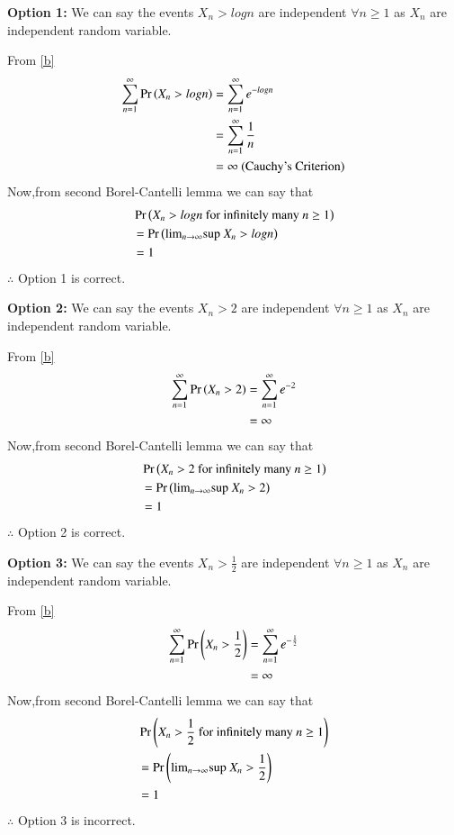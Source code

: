 \documentclass[journal,12pt,twocolumn]{IEEEtran}
\begin{document}
\textbf{Option 1:} 
We can say the events $X_n>log n$ are independent $\forall n\geq 1$ as $X_n$ are independent random variable.

From \eqref{b}
\begin{align}
    \sum_{n=1}^{\infty}\Pr\left(X_n > log n\right) &=\sum_{n=1}^{\infty}e^{-logn}\nonumber\\ &=\sum_{n=1}^{\infty}\frac{1}{n}\nonumber\\
                                        &= \infty  \text{ (Cauchy's Criterion)}\nonumber
\end{align}
Now,from second Borel-Cantelli lemma we can say that
\begin{align}
    &\Pr\left(X_n>logn \text{ for infinitely many }n\geq1\right)\nonumber\\
    &=\Pr\left(\text{lim}_{n \rightarrow \infty}\text{sup }X_n>logn\right)\nonumber\\
    &=1\nonumber
\end{align}
$\therefore$ Option 1 is correct.

\vspace{0.5cm}\textbf{Option 2:} We can say the events $X_n>2$ are independent $\forall n\geq 1$ as $X_n$ are independent random variable.

From \eqref{b}
\begin{align}
    \sum_{n=1}^{\infty}\Pr\left(X_n > 2\right) &= \sum_{n=1}^{\infty}e^{-2}\nonumber\\
                                        &= \infty\nonumber
\end{align}
Now,from second Borel-Cantelli lemma we can say that
\begin{align}
    &\Pr\left(X_n>2 \text{ for infinitely many }n\geq1\right)\nonumber\\
    &=\Pr\left(\text{lim}_{n \rightarrow \infty}\text{sup }X_n>2\right)\nonumber\\
    &=1\nonumber
\end{align}
$\therefore$ Option 2 is correct.


\vspace{0.5cm}\textbf{Option 3:} We can say the events $X_n>\frac{1}{2}$ are independent $\forall n\geq 1$ as $X_n$ are independent random variable.

From \eqref{b}
\begin{align}
    \sum_{n=1}^{\infty}\Pr\left(X_n > \frac{1}{2}\right) &= \sum_{n=1}^{\infty}e^{-\frac{1}{2}}\nonumber\\
                                        &= \infty\nonumber
\end{align}
Now,from second Borel-Cantelli lemma we can say that
\begin{align}
    &\Pr\left(X_n>\frac{1}{2} \text{ for infinitely many }n\geq1\right)\nonumber\\
    &=\Pr\left(\text{lim}_{n \rightarrow \infty}\text{sup }X_n>\frac{1}{2}\right)\nonumber\\
    &=1\nonumber
\end{align}
$\therefore$ Option 3 is incorrect.
\end{document}
